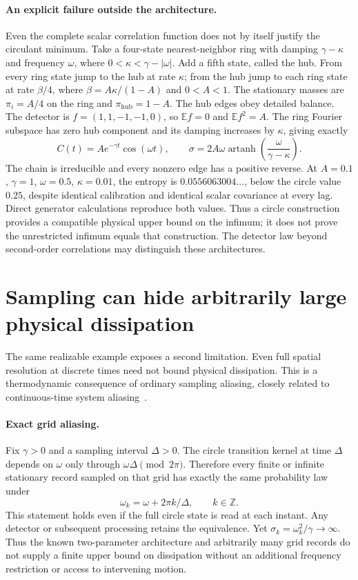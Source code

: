 \paragraph{An explicit failure outside the architecture.}
Even the complete scalar correlation function does not by itself justify the
circulant minimum. Take a four-state nearest-neighbor ring with damping
$\gamma-\kappa$ and frequency $\omega$, where
$0<\kappa<\gamma-|\omega|$. Add a fifth state, called the hub.
From every ring state jump to the hub at rate $\kappa$; from the hub jump
to each ring state at rate $\beta/4$, where
$\beta=A\kappa/(1-A)$ and $0<A<1$. The stationary masses are
$\pi_i=A/4$ on the ring and $\pi_\mathrm{hub}=1-A$.
The hub edges obey detailed balance. The detector is
$f=(1,1,-1,-1,0)$, so $\mathbb E f=0$ and $\mathbb E f^2=A$.
The ring Fourier subspace has zero hub component and its damping increases
by $\kappa$, giving exactly
\[
 C(t)=A e^{-\gamma t}\cos(\omega t),\qquad
 \sigma=2A\omega\operatorname{artanh}\!\left(
                       \frac{\omega}{\gamma-\kappa}\right).
\]
The chain is irreducible and every nonzero edge has a positive reverse.
At $A=0.1$, $\gamma=1$, $\omega=0.5$, $\kappa=0.01$, the entropy is
$0.0556063004\ldots$, below the circle value $0.25$, despite identical
calibration and identical scalar covariance at every lag. Direct generator
calculations reproduce both values. Thus a circle construction provides a
compatible physical upper bound on the infimum; it does not prove the
unrestricted infimum equals that construction. The detector law beyond
second-order correlations may distinguish these architectures.

\section{Sampling can hide arbitrarily large physical dissipation}
\label{sec:pa-entropy-aliasing}

The same realizable example exposes a second limitation. Even full spatial
resolution at discrete times need not bound physical dissipation. This is a
thermodynamic consequence of ordinary sampling aliasing, closely related to
continuous-time system aliasing~\cite{paYue2021}.

\paragraph{Exact grid aliasing.}
Fix $\gamma>0$ and a sampling interval $\Delta>0$. The circle transition
kernel at time $\Delta$ depends on $\omega$ only through
$\omega\Delta\pmod{2\pi}$. Therefore every finite or infinite
stationary record sampled on that grid has exactly the same probability
law under
\begin{equation}
 \omega_k=\omega+2\pi k/\Delta,\qquad k\in\mathbb Z.
 \label{eq:pa-frequency-alias}
\end{equation}
This statement holds even if the full circle state is read at each instant.
Any detector or subsequent processing retains the equivalence. Yet
$\sigma_k=\omega_k^2/\gamma\to\infty$. Thus the known two-parameter
architecture and arbitrarily many grid records do not supply a finite
upper bound on dissipation without an additional frequency restriction or
access to intervening motion.

